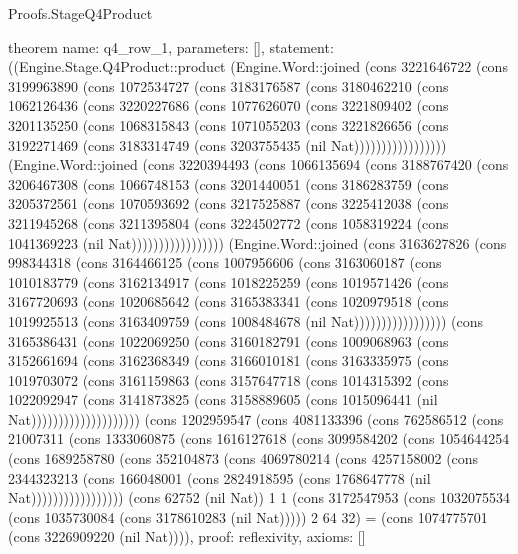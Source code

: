 \begin{lexlean}{Proofs.StageQ4Product}
\begin{semanticmodule}
theorem{
  name: q4_row_1,
  parameters: [],
  statement: ((Engine.Stage.Q4Product::product (Engine.Word::joined (cons 3221646722 (cons 3199963890 (cons 1072534727 (cons 3183176587 (cons 3180462210 (cons 1062126436 (cons 3220227686 (cons 1077626070 (cons 3221809402 (cons 3201135250 (cons 1068315843 (cons 1071055203 (cons 3221826656 (cons 3192271469 (cons 3183314749 (cons 3203755435 (nil Nat))))))))))))))))) (Engine.Word::joined (cons 3220394493 (cons 1066135694 (cons 3188767420 (cons 3206467308 (cons 1066748153 (cons 3201440051 (cons 3186283759 (cons 3205372561 (cons 1070593692 (cons 3217525887 (cons 3225412038 (cons 3211945268 (cons 3211395804 (cons 3224502772 (cons 1058319224 (cons 1041369223 (nil Nat))))))))))))))))) (Engine.Word::joined (cons 3163627826 (cons 998344318 (cons 3164466125 (cons 1007956606 (cons 3163060187 (cons 1010183779 (cons 3162134917 (cons 1018225259 (cons 1019571426 (cons 3167720693 (cons 1020685642 (cons 3165383341 (cons 1020979518 (cons 1019925513 (cons 3163409759 (cons 1008484678 (nil Nat))))))))))))))))) (cons 3165386431 (cons 1022069250 (cons 3160182791 (cons 1009068963 (cons 3152661694 (cons 3162368349 (cons 3166010181 (cons 3163335975 (cons 1019703072 (cons 3161159863 (cons 3157647718 (cons 1014315392 (cons 1022092947 (cons 3141873825 (cons 3158889605 (cons 1015096441 (nil Nat)))))))))))))))))))) (cons 1202959547 (cons 4081133396 (cons 762586512 (cons 21007311 (cons 1333060875 (cons 1616127618 (cons 3099584202 (cons 1054644254 (cons 1689258780 (cons 352104873 (cons 4069780214 (cons 4257158002 (cons 2344323213 (cons 166048001 (cons 2824918595 (cons 1768647778 (nil Nat))))))))))))))))) (cons 62752 (nil Nat)) 1 1 (cons 3172547953 (cons 1032075534 (cons 1035730084 (cons 3178610283 (nil Nat))))) 2 64 32) = (cons 1074775701 (cons 3226909220 (nil Nat)))),
  proof: reflexivity{},
  axioms: []
}


\end{semanticmodule}
\end{lexlean}
